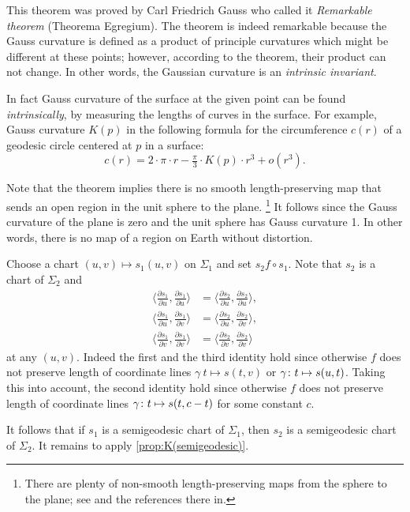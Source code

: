 This theorem was proved by Carl Friedrich Gauss \cite{gauss} who called it \emph{Remarkable theorem} (Theorema Egregium).
The theorem is indeed remarkable because the Gauss curvature is defined as a product of principle curvatures which might be different at these points; however, according to the theorem, their product can not change.
In other words, the Gaussian curvature is an \emph{intrinsic invariant}.

In fact Gauss curvature of the surface at the given point can be found \emph{intrinsically},
by measuring the lengths of curves in the surface.
For example, Gauss curvature $K(p)$ in the following formula for the circumference $c(r)$ of a geodesic circle centered at $p$ in a surface: 
\[c(r)=2\cdot\pi\cdot r-\tfrac\pi3\cdot K(p)\cdot r^3+o(r^3).\]

Note that the theorem implies there is no smooth length-preserving map that sends an open region in the unit sphere to the plane.%
\footnote{There are plenty of non-smooth length-preserving maps from the sphere to the plane; see \cite{petrunin-yashinski} and the references there in.}
It follows since the Gauss curvature of the plane is zero and the unit sphere has Gauss curvature 1. 
In other words, there is no map of a region on Earth without distortion.

Choose a chart $(u,v)\mapsto s_1(u,v)$ on $\Sigma_1$ and set
$s_2 f\circ s_1$.
Note that $s_2$ is a chart of $\Sigma_2$ and 
\begin{align*}
\langle\tfrac{\partial s_1}{\partial u},\tfrac{\partial s_1}{\partial u}\rangle
&=
\langle\tfrac{\partial s_2}{\partial u},\tfrac{\partial s_2}{\partial u}\rangle,
\\
\langle\tfrac{\partial s_1}{\partial u},\tfrac{\partial s_1}{\partial v}\rangle
&=
\langle\tfrac{\partial s_2}{\partial u},\tfrac{\partial s_2}{\partial v}\rangle,
\\
\langle\tfrac{\partial s_1}{\partial v},\tfrac{\partial s_1}{\partial v}\rangle
&=
\langle\tfrac{\partial s_2}{\partial v},\tfrac{\partial s_2}{\partial v}\rangle
\end{align*}
at any $(u,v)$.
Indeed the first and the third identity hold since otherwise $f$ does not preserve length of coordinate lines $\gamma\:t\mapsto s(t,v)$ or  $\gamma\:t\z\mapsto s(u,t)$.
Taking this into account, the second identity hold since otherwise $f$ does not preserve length of coordinate lines $\gamma\:t\z\mapsto s(t,c-t)$ for some constant $c$.

It follows that if $s_1$ is a semigeodesic chart of $\Sigma_1$,
then $s_2$ is a semigeodesic chart of $\Sigma_2$.
It remains to apply \ref{prop:K(semigeodesic)}.
\qeds


